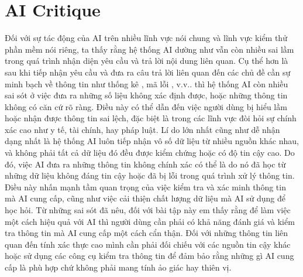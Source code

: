 \section{AI Critique}

Đối với sự tác động của AI trên nhiều lĩnh vực nói chung và lĩnh vực kiểm thử phần mềm nói riêng, ta thấy rằng hệ thống AI dường như vẫn còn nhiều sai lầm trong quá trình nhận diện yêu cầu và trả lời nội dung liên quan. Cụ thể hơn là sau khi tiếp nhận yêu cầu và đưa ra câu trả lời liên quan đến các chủ đề cần sự minh bạch về thông tin như thống kê , mã lỗi , v.v.. thì hệ thống AI còn nhiều sai sót ở việc đưa ra những số liệu không xác định được, hoặc những thông tin không có căn cứ rõ ràng. Điều này có thể dẫn đến việc người dùng bị hiểu lầm hoặc nhận được thông tin sai lệch, đặc biệt là trong các lĩnh vực đòi hỏi sự chính xác cao như y tế, tài chính, hay pháp luật. Lí do lớn nhất cũng như dễ nhận dạng nhất là hệ thống AI luôn tiếp nhận vô số dữ liệu từ nhiều nguồn khác nhau, và không phải tất cả dữ liệu đó đều được kiểm chứng hoặc có độ tin cậy cao. Do đó, việc AI đưa ra những thông tin không chính xác có thể là do nó đã học từ những dữ liệu không đáng tin cậy hoặc đã bị lỗi trong quá trình xử lý thông tin. Điều này nhấn mạnh tầm quan trọng của việc kiểm tra và xác minh thông tin mà AI cung cấp, cũng như việc cải thiện chất lượng dữ liệu mà AI sử dụng để học hỏi.
Từ những sai sót đã nêu, đối với bài tập này em thấy rằng để làm việc một cách hiệu quả với AI thì người dùng cần phải có khả năng đánh giá và kiểm tra thông tin mà AI cung cấp một cách cẩn thận. Đối với những thông tin liên quan đến tính xác thực cao mình cần phải đối chiếu với các nguồn tin cậy khác hoặc sử dụng các công cụ kiểm tra thông tin để đảm bảo rằng những gì AI cung cấp là phù hợp chứ không phải mang tính ảo giác hay thiên vị.